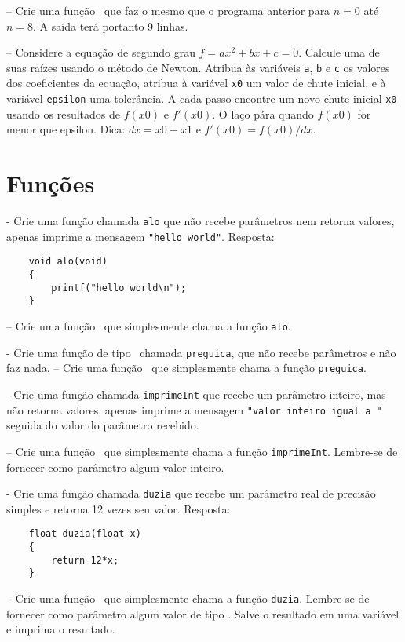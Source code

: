 \NEWLINE
\quest – Crie uma função \MAIN\ que faz o mesmo que o programa anterior para $n=0$ até $n=8$. A saída terá portanto 9 linhas.

\NEWLINE
\quest – Considere a equação de segundo grau $f = ax^2 + bx + c = 0$. Calcule uma de suas raízes usando o método de Newton. Atribua às variáveis {\tt a}, {\tt b} e {\tt c} os valores dos coeficientes da equação, atribua à variável {\tt x0} um valor de chute inicial, e à variável {\tt epsilon} uma tolerância. A cada passo encontre um novo chute inicial {\tt x0} usando os resultados de $f(x0)$ e $f'(x0)$. O laço pára quando $f(x0)$ for menor que epsilon. Dica: $dx = x0 - x1$ e $ f'(x0) = f(x0) / dx$. 



\zeraquest

\section{Funções}

\quest - Crie uma função chamada {\tt alo} que não recebe parâmetros nem retorna valores, apenas imprime a mensagem \verb|"hello world"|.
	Resposta:
\begin{lstlisting}
	void alo(void)
	{
		printf("hello world\n");
	}
\end{lstlisting}
\NEWLINE
\quest – Crie uma função \MAIN\ que simplesmente chama a função {\tt alo}.

\NEWLINE
\quest - Crie uma função de tipo \VOID\ chamada {\tt preguica}, que não recebe parâmetros e não faz nada.
\NEWLINE
\quest – Crie uma função \MAIN\ que simplesmente chama a função {\tt preguica}.

\NEWLINE
\quest - Crie uma função chamada {\tt imprimeInt} que recebe um parâmetro inteiro, mas não retorna valores, apenas imprime a mensagem \verb|"valor inteiro igual a "| seguida do valor do parâmetro recebido.

\NEWLINE
\quest – Crie uma função \MAIN\ que simplesmente chama a função {\tt imprimeInt}. Lembre-se de fornecer como parâmetro algum valor inteiro.

\NEWLINE
\quest - Crie uma função chamada {\tt duzia} que recebe um parâmetro real de precisão simples e retorna 12 vezes seu valor.
	Resposta:
\begin{lstlisting}
	float duzia(float x)
	{
		return 12*x;
	}
\end{lstlisting}
\NEWLINE
\quest – Crie uma função \MAIN\ que simplesmente chama a função {\tt duzia}. Lembre-se de fornecer como parâmetro algum valor de tipo \FLOAT. Salve o resultado em uma variável e imprima o resultado.

